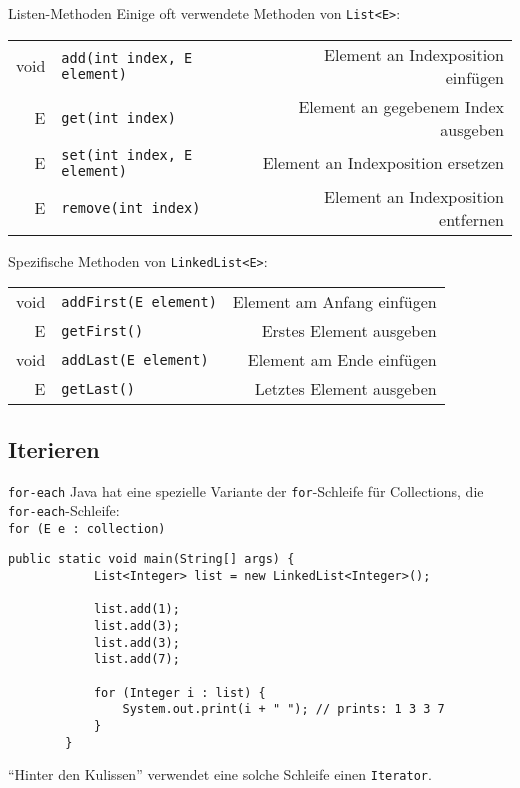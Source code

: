 \begin{frame}[fragile]{Listen-Methoden}
    Einige oft verwendete Methoden von \texttt{List<E>}: \\
    \smallskip
    \begin{tabular}{ r l r }
        void & \scriptsize{\texttt{add(int index, E element)}} & \footnotesize{Element an Indexposition einfügen} \\
        E &\scriptsize{\texttt{get(int index)}} & \footnotesize{Element an gegebenem Index ausgeben} \\
        E &\scriptsize{\texttt{set(int index, E element)}} & \footnotesize{Element an Indexposition ersetzen} \\
        E &\scriptsize{\texttt{remove(int index)}} & \footnotesize{Element an Indexposition entfernen}
    \end{tabular}
    \vfill
    Spezifische Methoden von \texttt{LinkedList<E>}: \\
    \smallskip
    \begin{tabular}{ r l r }
        void & \scriptsize{\texttt{addFirst(E element)}} & \footnotesize{Element am Anfang einfügen} \\
        E & \scriptsize{\texttt{getFirst()}} & \footnotesize{Erstes Element ausgeben} \\
        void & \scriptsize{\texttt{addLast(E element)}} & \footnotesize{Element am Ende einfügen} \\
        E & \scriptsize{\texttt{getLast()}} & \footnotesize{Letztes Element ausgeben}
    \end{tabular}
\end{frame}

\subsection{Iterieren}
\begin{frame}[fragile]{\texttt{for-each}}
    Java hat eine spezielle Variante der \texttt{for}-Schleife für Collections, die \texttt{for-each}-Schleife: \\
    \texttt{for (E e : collection)}
    \begin{lstlisting}[gobble=8]
        public static void main(String[] args) {
            List<Integer> list = new LinkedList<Integer>();

            list.add(1);
            list.add(3);
            list.add(3);
            list.add(7);

            for (Integer i : list) {
                System.out.print(i + " "); // prints: 1 3 3 7
            }
        }
    \end{lstlisting}
    \enquote{Hinter den Kulissen} verwendet eine solche Schleife einen \texttt{Iterator}.
\end{frame}


